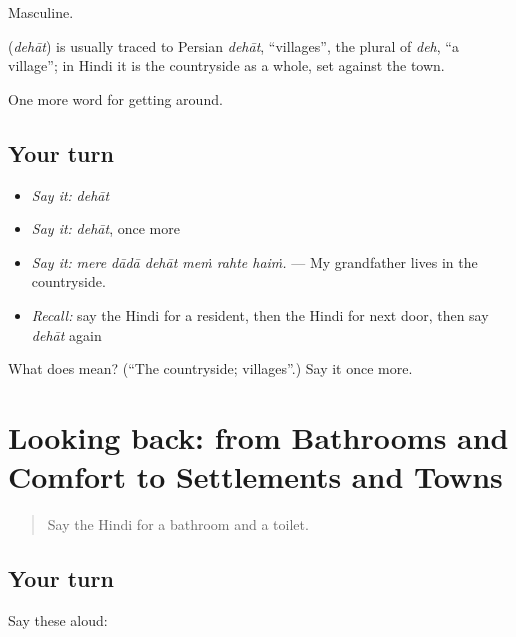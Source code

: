 Masculine.

\begin{cousinweb}
\textbf{} (\emph{dehāt}) is usually traced to Persian \emph{dehāt}, \textquotedblleft{}villages\textquotedblright{}, the plural of \emph{deh}, \textquotedblleft{}a village\textquotedblright{}; in Hindi it is the countryside as a whole, set against the town.
\end{cousinweb}

\begin{grammarlens}[title={What you've built}]
One more word for getting around.
\end{grammarlens}

\subsection*{Your turn}
\begin{itemize}
\raggedright
  \item \emph{Say it:} \emph{dehāt}
  \item \emph{Say it:} \emph{dehāt}, once more
  \item \emph{Say it:} \emph{mere dādā dehāt meṁ rahte haiṁ.} — My grandfather lives in the countryside.
  \item \emph{Recall:} say the Hindi for a resident, then the Hindi for next door, then say \emph{dehāt} again
\end{itemize}

\begin{tcolorbox}[breakable,colback=teal!4,colframe=teal!35!black,title={Before you move on}]
What does  mean? (\textquotedblleft{}The countryside; villages\textquotedblright{}.) Say it once more.
\end{tcolorbox}
\section[(dialogue)]{Looking back: from Bathrooms and Comfort to Settlements and Towns}

\label{lesson:HI-R421-review-414-421}



\begin{quote}
Say the Hindi for a bathroom and a toilet.
\end{quote}

\subsection*{Your turn}
Say these aloud:


